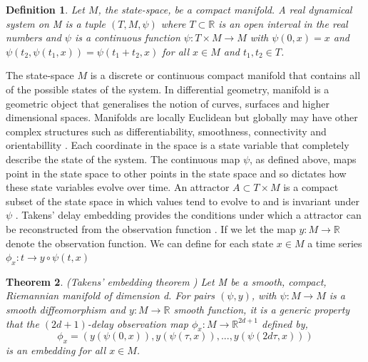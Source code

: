 \documentclass{article}
\newcommand{\be}{\begin{equation}}
\newcommand{\ee}{\end{equation}}
\newtheorem{theorem}{Theorem}[section]
\newtheorem{definition}[theorem]{Definition}
\begin{document}
\begin{definition} Let $M$, the state-space, be a compact manifold. A real dynamical system on M is a tuple $(T,M,\psi)$ where $T \subset \mathbb{R}$ is an open interval in the real numbers and $\psi$ is a continuous function $\psi:T \times M \to M$ with $\psi(0,x)=x$ and $\psi(t_2, \psi(t_1,x))= \psi(t_1 +t_2,x)$ for all $x \in M$ and $t_1, t_2 \in T$.
\end{definition}
The state-space $M$ is a discrete or continuous compact manifold that contains all of the possible states of the system. In differential geometry, manifold is a geometric object that generalises the notion of curves, surfaces and higher dimensional spaces. Manifolds are locally Euclidean but globally may have other complex structures such as differentiability, smoothness, connectivity and orientabillity \cite{smoothmanifoldLee}. Each coordinate in the space is a state variable that completely describe the state of the system. The continuous map $\psi$, as defined above, maps point in the state space to other points in the state space and so dictates how these state variables evolve over time. An attractor $A \subset T \times M$ is a compact subset of the state space in which values tend to evolve to and is invariant under $\psi$ \cite{dynamicalsystemsHiroki}. 
Takens' delay embedding provides the conditions under which a attractor can be reconstructed from the observation function \cite{twistytakensPerea}. If we let the map $y:M \to \mathbb{R}$ denote the observation function. We can define for each state $x \in M$ a time series $\phi_x : t \to y \circ \psi(t,x)$ 
\begin{theorem} (Takens' embedding theorem \cite{takens1981detecting}) Let M be a smooth, compact, Riemannian manifold of dimension d. For pairs $(\psi,y)$, with $\psi:M\to M$ is a smooth diffeomorphism and $y:M \to \mathbb{R}$ smooth function, it is a generic property that the $(2d+1)$-delay observation map $\phi_x: M \to \mathbb{R}^{2d+1}$ defined by,
\be
\phi_x = (y(\psi(0,x)), y(\psi(\tau,x)),...,y(\psi(2d\tau,x)))
\ee
is an embedding for all $x \in M$.
\end{theorem}
\end{document}
